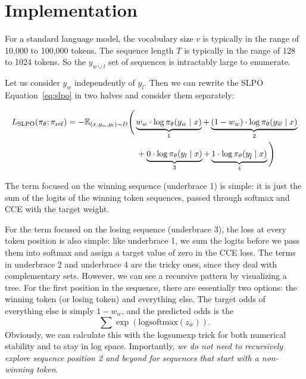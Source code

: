 \documentclass[twoside,11pt]{article}
\begin{document}
\section{Implementation}

For a standard language model, the vocabulary size $v$ is typically in the range
of 10,000 to 100,000 tokens. The sequence length $T$ is typically
in the range of 128 to 1024 tokens. 
So the $y_{\overline{w \cup l}}$ set of sequences is intractably large to 
enumerate. 

Let us consider $y_w$ independently of $y_l$. Then we can rewrite
the SLPO Equation~\ref{eq:slpo} in two halves and consider them separately:

\begin{align}
  \nonumber
  \label{eq:slpo-equiv}
  L_\mathrm{SLPO}(\pi_\theta; \pi_\mathrm{ref}) =
  -\mathbb{E}_{(x, y_w, y_l) \sim D} 
  &\Bigg(
  \underbrace{
      w_w \cdot \log \pi_\theta(y_w \mid x)
    }_{1}
    + 
    \underbrace{
      (1 - w_w) \cdot \log \pi_\theta(y_{\overline{w}} \mid x)
    }_{2} \notag \\
  &\quad +
  \underbrace{ 
      0 \cdot \log \pi_\theta(y_l \mid x)
    }_{3}
      + 
      \underbrace{ 
        1 \cdot \log \pi_\theta(y_{\overline{l}} \mid x)
      }_{4}
  \Bigg)
\end{align}

The term focused on the winning sequence (underbrace 1) is simple: 
it is just the sum of the logits of the winning token sequences, passed
through softmax and CCE with the target weight. 

For the term focused on the losing sequence (underbrace 3), the loss at 
every token position is also simple: like underbrace 1, we sum the logits
before we pass them into softmax 
and assign a target value of zero in the CCE loss. 
The terms in underbrace 2 and underbrace 4 are the tricky ones, since
they deal with complementary sets.
However, we can see a recursive 
pattern by visualizing a tree. For the first position in the sequence, there 
are essentially two options: 
the winning token (or losing token) and everything else. 
The target odds of everything else is simply
\( 1 - w_w \), and the predicted odds is the 
\[
\sum \exp\left(\mathrm{logsoftmax}(z_{\overline{w}})\right).
\]
Obviously, we can calculate
this with the logsumexp trick for both numerical stability and to stay in 
log space.
Importantly, \emph{we do not need to recursively explore sequence
position 2 and beyond for sequences that start with a non-winning token}. 
\end{document}
